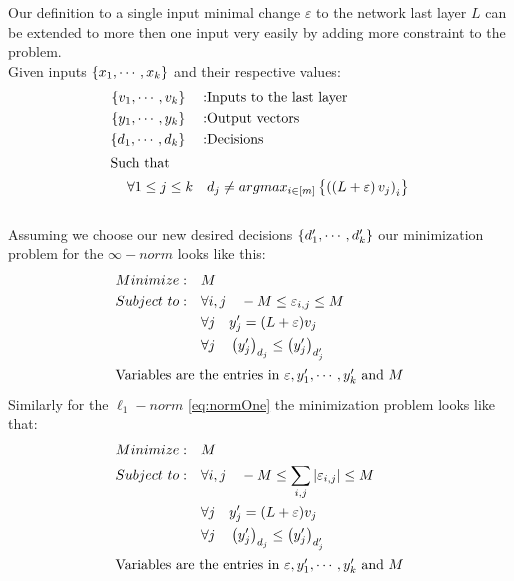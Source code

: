 \documentclass[a4paper]{llncs}
\newcommand{\guy}[1]{\marginpar{\textcolor{orange}{Guy: #1}}}
\begin{document}
Our definition to a single input minimal change $\varepsilon$ to the network last layer $L$ can be extended to more then one input very easily by adding more constraint to the problem.
\\
Given inputs $\left\lbrace x_1,\cdots,x_k\right\rbrace$ and their respective values:
\begin{align*}
\left\lbrace v_1,\cdots,v_k\right\rbrace\quad: & \text{Inputs to the last layer} \\
\left\lbrace y_1,\cdots,y_k\right\rbrace\quad: & \text{Output vectors} \\
\left\lbrace d_1,\cdots,d_k\right\rbrace\quad: & \text{Decisions} \\
\intertext{Such that}
\forall 1\leq j\leq k\quad & d_j \neq argmax_{i\in\left[m\right]}\left\lbrace \left(\left(L+\varepsilon\right)v_j\right)_i\right\rbrace
\end{align*}
\\
Assuming we choose our new desired decisions
$\left\lbrace d'_1,\cdots,d'_k\right\rbrace$ our minimization problem for the $\infty-norm$ looks like this:
\begin{equation}
\label{eq:LPmany}
\begin{split}
    Minimize:\quad & M \\
    Subject\ to:\quad & \forall i,j\quad -M \leq\varepsilon_{i,j}\leq M\\
    & \forall j\quad y'_j=(L+\varepsilon)v_j \\
    & \forall j\quad \left(y'_j\right)_{d_j} \leq \left(y'_j\right)_{d'_j}\\
	\intertext{Variables are the entries in $\varepsilon,y'_1,\cdots,y'_k$ and $M$}
\end{split}
\end{equation}
Similarly for the $\ell_1-norm$ \ref{eq:normOne} the minimization problem looks like that:
\begin{equation}
\label{eq:NotLPmany}
\begin{split}
    Minimize:\quad & M \\
    Subject\ to:\quad & \forall i,j\quad -M \leq\sum_{i,j}\left\lvert\varepsilon_{i,j}\right\rvert\leq M\\
    & \forall j\quad y'_j=(L+\varepsilon)v_j \\
    & \forall j\quad \left(y'_j\right)_{d_j} \leq \left(y'_j\right)_{d'_j}\\
	\intertext{Variables are the entries in $\varepsilon,y'_1,\cdots,y'_k$ and $M$}
\end{split}
\end{equation}

\guy{Overall, this looks good. Some stuff will need to be moved to other
sections according to the paper layout.}
\end{document}
